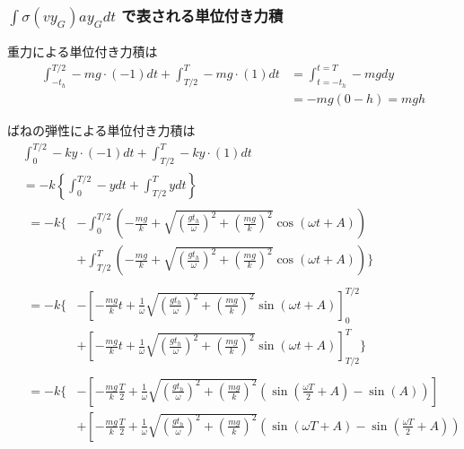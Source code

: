 \documentclass[a4paper,11pt]{jsarticle}
\begin{document}
\subsubsection{$\int\sigma (vy_G)ay_G dt$ で表される単位付き力積}
重力による単位付き力積は
\begin{align}
  \int_{-t_h}^{T/2} -mg \cdot (-1) dt
  + \int_{T/2}^{T} -mg \cdot (1) dt
   & = \int_{t=-t_h}^{t=T} -mgdy
  \\
   & = -mg(0 - h) = mgh
\end{align}

ばねの弾性による単位付き力積は
\begin{align}
   & \int_{0}^{T/2} -ky \cdot (-1) dt
  + \int_{T/2}^{T} -ky \cdot (1) dt
  \\
   & = -k \left\{
  \int_{0}^{T/2} -y dt + \int_{T/2}^{T} y dt
  \right\}
  \\
   &
  \begin{aligned}
    = -k \Bigg\{
     & - \int_{0}^{T/2} \left(
    -\frac{mg}{k} + \sqrt{\left(\frac{gt_h}{\omega}\right)^2 + \left(\frac{mg}{k}\right)^2}\cos \left( \omega t + A \right)
    \right)
    \\
     & + \int_{T/2}^{T} \left(
    -\frac{mg}{k} + \sqrt{\left(\frac{gt_h}{\omega}\right)^2 + \left(\frac{mg}{k}\right)^2}\cos \left( \omega t + A \right)
    \right) \Bigg\}
  \end{aligned}
  \\
   & \begin{aligned}
       = -k \Bigg\{
        & - \left[
         -\frac{mg}{k}t + \frac{1}{\omega} \sqrt{\left(\frac{gt_h}{\omega}\right)^2 + \left(\frac{mg}{k}\right)^2} \sin (\omega t + A)
         \right]_0^{T/2}
       \\
        & + \left[
         -\frac{mg}{k}t + \frac{1}{\omega} \sqrt{\left(\frac{gt_h}{\omega}\right)^2 + \left(\frac{mg}{k}\right)^2} \sin (\omega t + A)
         \right]_{T/2}^T
       \Bigg\}
     \end{aligned}
  \\
   & \begin{aligned}
       = -k \Bigg\{
        & - \left[
         -\frac{mg}{k}\frac{T}{2} + \frac{1}{\omega} \sqrt{\left(\frac{gt_h}{\omega}\right)^2 + \left(\frac{mg}{k}\right)^2} (\sin(\frac{\omega T}{2} + A) - \sin(A))
         \right]
       \\
        & + \left[
         -\frac{mg}{k}\frac{T}{2} + \frac{1}{\omega} \sqrt{\left(\frac{gt_h}{\omega}\right)^2 + \left(\frac{mg}{k}\right)^2} (\sin(\omega T + A) - \sin(\frac{\omega T}{2} + A))

\end{aligned}
\end{align}
\end{document}

